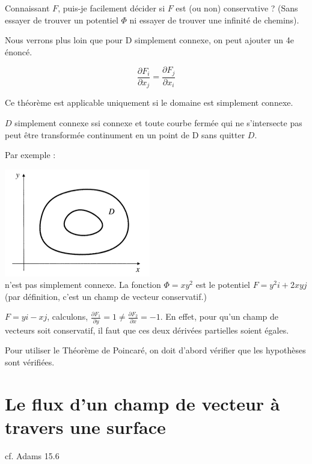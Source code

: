 \begin{mytheo}

Connaissant $F$, puis-je facilement décider si $F$ est (ou non) conservative ? (Sans essayer de trouver un potentiel $\Phi$ ni essayer de trouver une infinité de chemins).

Nous verrons plus loin que pour D simplement connexe, on peut ajouter un 4e énoncé.

$$\frac{\partial F_i}{\partial x_j} = \frac{\partial F_j}{\partial x_i}$$

Ce théorème est applicable uniquement si le domaine est simplement connexe.
\end{mytheo}

\begin{mydef}
$D$ simplement connexe ssi connexe et toute courbe fermée qui ne s'intersecte pas peut être  transformée continument en un point de D sans quitter $D$.
\end{mydef}

Par exemple :

\includegraphics[scale=0.7]{image2.png}\\
n'est pas simplement connexe.
La fonction $ \Phi =xy^2 $  est le potentiel $F=y^2i+2xyj$ (par définition, c'est un champ de vecteur conservatif.)

$F= yi-xj$, calculons, $\frac{\partial F_1}{\partial y} = 1 \neq \frac{\partial F_2}{\partial x} = -1$. En effet, pour qu'un champ de vecteurs soit conservatif, il faut que ces deux dérivées partielles soient égales.

Pour utiliser le Théorème de Poincaré, on doit d'abord vérifier que les hypothèses sont vérifiées.

\section{Le flux d'un champ de vecteur à travers une surface}

cf. Adams 15.6\\

